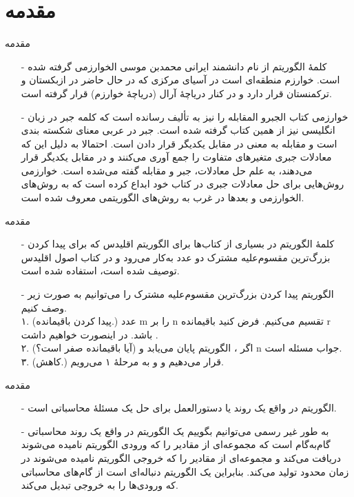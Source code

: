 \section{مقدمه}


\begin{frame}{مقدمه}
\begin{itemize}\itemr
\item[-]
کلمهٔ الگوریتم از نام دانشمند ایرانی محمدبن موسی الخوارزمی گرفته شده است.
خوارزم منطقه‌ای است در آسیای مرکزی که در حال حاضر در ازبکستان و ترکمنستان قرار دارد و در کنار دریاچهٔ آرال (دریاچهٔ خوارزم) قرار گرفته است.
\item[-]
خوارزمی کتاب الجبرو المقابله را نیز به تألیف رسانده است که کلمه جبر
در زبان انگلیسی نیز از همین کتاب گرفته شده است.
جبر در عربی معنای شکسته بندی است و مقابله به معنی در مقابل یکدیگر قرار دادن است. احتمالا به دلیل این که معادلات جبری متغیرهای متفاوت را جمع آوری می‌کنند و در مقابل یکدیگر قرار می‌دهند، به علم حل معادلات، جبر و مقابله گفته می‌شده است. خوارزمی روش‌هایی برای حل معادلات جبری در کتاب خود ابداع کرده است که به روش‌های الخوارزمی و بعدها در غرب به روش‌های الگوریتمی معروف شده است.
\end{itemize}
\end{frame}


\begin{frame}{مقدمه}
\begin{itemize}\itemr
\item[-]
کلمهٔ الگوریتم در بسیاری از کتاب‌ها برای الگوریتم اقلیدس
که برای پیدا کردن بزرگ‌ترین مقسوم‌علیه مشترک
دو عدد به‌کار می‌رود و در کتاب اصول اقلیدس
توصیف شده است، استفاده شده است.
\item[-]
الگوریتم پیدا کردن بزرگ‌ترین مقسوم‌علیه مشترک را می‌توانیم به صورت زیر وصف کنیم.\\
۱. (پیدا کردن باقیمانده.) عدد
m
را بر
n
تقسیم می‌کنیم. فرض کنید باقیمانده
r 
باشد. در اینصورت خواهیم داشت
 .\\
۲. (آیا باقیمانده صفر است؟) اگر
، الگوریتم پایان می‌یابد و
n
جواب مسئله است.\\
۳. (کاهش.) قرار می‌دهیم
و
و به مرحلهٔ ۱ می‌رویم.
\end{itemize}
\end{frame}


\begin{frame}{مقدمه}
\begin{itemize}\itemr
\item[-]
الگوریتم در واقع یک روند
یا دستورالعمل
برای حل یک مسئلهٔ محاسباتی است.
\item[-]
به طور غیر رسمی می‌توانیم بگوییم یک الگوریتم در واقع یک روند محاسباتی گام‌به‌گام است که مجموعه‌ای از مقادیر را که ورودی الگوریتم نامیده می‌شوند دریافت می‌کند و مجموعه‌ای از مقادیر را که خروجی الگوریتم نامیده می‌شوند در زمان محدود تولید می‌کند. بنابراین یک الگوریتم دنباله‌ای است از گام‌های محاسباتی که ورودی‌ها را به خروجی تبدیل می‌کند.
\end{itemize}
\end{frame}


